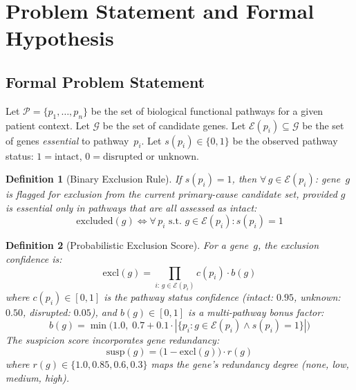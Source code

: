 \documentclass[12pt,a4paper]{article}
\newtheorem{definition}{Definition}
\begin{document}
\section{Problem Statement and Formal Hypothesis}
\label{sec:problem}

\subsection{Formal Problem Statement}

Let $\mathcal{P} = \{p_1, \ldots, p_n\}$ be the set of biological functional pathways for a given patient context. Let $\mathcal{G}$ be the set of candidate genes. Let $\mathcal{E}(p_i) \subseteq \mathcal{G}$ be the set of genes \emph{essential} to pathway~$p_i$. Let $s(p_i) \in \{0, 1\}$ be the observed pathway status: $1 = \text{intact}$, $0 = \text{disrupted or unknown}$.

\begin{definition}[Binary Exclusion Rule]
\label{def:binary}
If $s(p_i) = 1$, then $\forall\, g \in \mathcal{E}(p_i)$: gene~$g$ is flagged for \emph{exclusion} from the current primary-cause candidate set, provided $g$ is essential only in pathways that are all assessed as intact:
\begin{equation}
    \text{excluded}(g) \iff \forall\, p_i \text{ s.t. } g \in \mathcal{E}(p_i): s(p_i) = 1
\end{equation}
\end{definition}

\begin{definition}[Probabilistic Exclusion Score]
\label{def:probabilistic}
For a gene~$g$, the exclusion confidence is:
\begin{equation}
    \text{excl}(g) = \prod_{i:\, g \in \mathcal{E}(p_i)} c(p_i) \cdot b(g)
\end{equation}
where $c(p_i) \in [0,1]$ is the pathway status confidence (intact: $0.95$, unknown: $0.50$, disrupted: $0.05$), and $b(g) \in [0,1]$ is a multi-pathway bonus factor:
\begin{equation}
    b(g) = \min\!\Big(1.0,\; 0.7 + 0.1 \cdot |\{p_i : g \in \mathcal{E}(p_i) \wedge s(p_i) = 1\}|\Big)
\end{equation}
The \emph{suspicion score} incorporates gene redundancy:
\begin{equation}
    \text{susp}(g) = \big(1 - \text{excl}(g)\big) \cdot r(g)
\end{equation}
where $r(g) \in \{1.0, 0.85, 0.6, 0.3\}$ maps the gene's redundancy degree (none, low, medium, high).
\end{definition}
\end{document}
